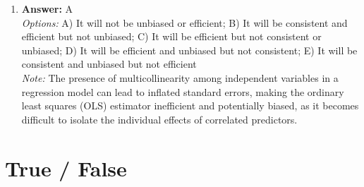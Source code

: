 \documentclass[12pt]{article}
\begin{document}
\begin{enumerate}[label=\arabic*.]
\item \textbf{Answer:} A
\\ \textit{Options:} A) It will not be unbiased or efficient; B) It will be consistent and efficient but not unbiased; C) It will be efficient but not consistent or unbiased; D) It will be efficient and unbiased but not consistent; E) It will be consistent and unbiased but not efficient
\\ \textit{Note:} The presence of multicollinearity among independent variables in a regression model can lead to inflated standard errors, making the ordinary least squares (OLS) estimator inefficient and potentially biased, as it becomes difficult to isolate the individual effects of correlated predictors.
\end{enumerate}

\section*{True / False}
\end{document}

